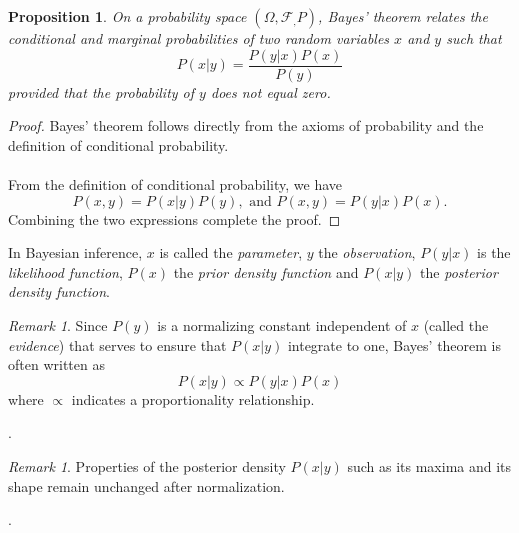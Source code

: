 \documentclass{article}
\newtheorem{prop}[thm]{Proposition}
\theoremstyle{definition}
\theoremstyle{remark}
\newtheorem{remark}[thm]{Remark}
\newcommand{\filtration}[1]{\ensuremath{\mathscr{F}_{#1}}}
\begin{document}
\begin{prop}
On a probability space $(\Omega, \filtration, P)$, \emph{Bayes' theorem} relates the conditional and marginal probabilities of two random variables $x$ and $y$ such that
\begin{equation}\label{eq:bayes}
P(x|y)=\frac{P(y|x)P(x)}{P(y)}
\end{equation}
provided that the probability of $y$ does not equal zero.
\end{prop}

\begin{proof}
Bayes' theorem follows directly from the axioms of probability and the definition of conditional probability.\\
\\
From the definition of conditional probability, we have
\begin{equation*}
P(x,y)=P(x|y)P(y), \text{ and } P(x,y)=P(y|x)P(x).
\end{equation*}
Combining the two expressions complete the proof.
\end{proof}

In Bayesian inference, $x$ is called the \emph{parameter}, $y$ the \emph{observation}, $P(y|x)$ is the \emph{likelihood function}, $P(x)$ the \emph{prior density function} and $P(x|y)$ the \emph{posterior density function}. 
\\
\begin{remark}\label{rem:evidence}
Since $P(y)$ is a normalizing constant independent of $x$ (called the \emph{evidence}) that serves to ensure that $P(x|y)$ integrate to one, Bayes' theorem is often written as
\begin{equation*}
P(x|y) \propto P(y|x)P(x)
\end{equation*}
where $\propto$ indicates a proportionality relationship.
\end{remark}
{\tiny.} 
\begin{remark}\label{rem:evidence02}
Properties of the posterior density $P(x|y)$ such as its maxima and its shape remain unchanged after normalization.
\end{remark}
{\tiny.} 
\end{document}
